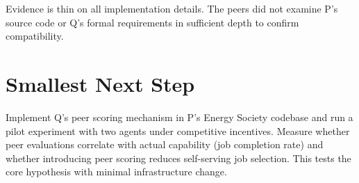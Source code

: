 \documentclass{article}
\begin{document}
Evidence is thin on all implementation details. The peers did not examine P's source code or Q's formal requirements in sufficient depth to confirm compatibility.

\section*{Smallest Next Step}

Implement Q's peer scoring mechanism in P's Energy Society codebase and run a pilot experiment with two agents under competitive incentives. Measure whether peer evaluations correlate with actual capability (job completion rate) and whether introducing peer scoring reduces self-serving job selection. This tests the core hypothesis with minimal infrastructure change.
\end{document}
